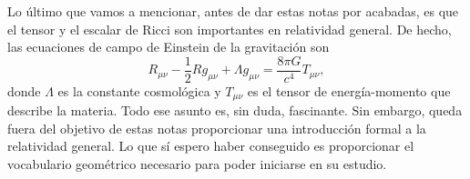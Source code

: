 Lo último que vamos a mencionar, antes de dar estas notas por acabadas, es que el tensor y el escalar de Ricci son importantes en relatividad general. De hecho, las ecuaciones de campo de Einstein de la gravitación son
\begin{equation}
    R_{\mu\nu} - \frac{1}{2}Rg_{\mu\nu} + \Lambda g_{\mu\nu} = \frac{8\pi G}{c^4} T_{\mu\nu},
\end{equation}
donde \(\Lambda\) es la constante cosmológica y \(T_{\mu\nu}\) es el tensor de energía-momento que describe la materia. Todo ese asunto es, sin duda, fascinante. Sin embargo, queda fuera del objetivo de estas notas proporcionar una introducción formal a la relatividad general. Lo que sí espero haber conseguido es proporcionar el vocabulario geométrico necesario para poder iniciarse en su estudio.
